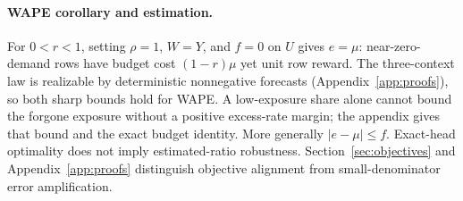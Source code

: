 \paragraph{WAPE corollary and estimation.}
For $0<r<1$, setting $\rho=1$, $W=Y$, and $f=0$ on $U$ gives
$e=\mu$: near-zero-demand rows have budget cost $(1-r)\mu$ yet
unit row reward. The three-context law is realizable by deterministic
nonnegative forecasts (Appendix~\ref{app:proofs}), so both sharp bounds
hold for WAPE. A low-exposure share alone cannot bound the forgone
exposure without a positive excess-rate margin; the appendix gives
that bound and the exact budget identity. More generally $|e-\mu|\leq f$.
Exact-head optimality does not imply estimated-ratio robustness.
Section~\ref{sec:objectives} and Appendix~\ref{app:proofs} distinguish
objective alignment from small-denominator error amplification.


